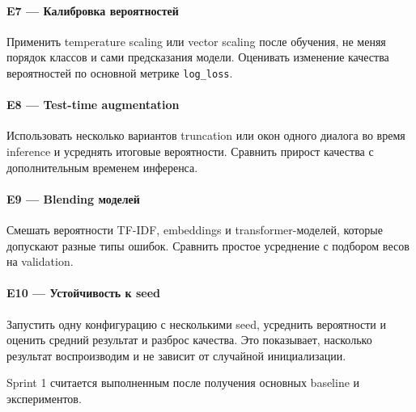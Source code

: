 \documentclass[a4paper,11pt]{article}
\newcommand{\code}[1]{\texttt{#1}}
\newcommand{\experiment}[2]{\paragraph{\textcolor{accent}{#1 --- #2}}}
\begin{document}
\experiment{E7}{Калибровка вероятностей}
Применить temperature scaling или vector scaling после обучения, не меняя
порядок классов и сами предсказания модели. Оценивать изменение качества
вероятностей по основной метрике \code{log\_loss}.

\experiment{E8}{Test-time augmentation}
Использовать несколько вариантов truncation или окон одного диалога во время
inference и усреднять итоговые вероятности. Сравнить прирост качества с
дополнительным временем инференса.

\experiment{E9}{Blending моделей}
Смешать вероятности TF-IDF, embeddings и transformer-моделей, которые допускают
разные типы ошибок. Сравнить простое усреднение с подбором весов на validation.

\experiment{E10}{Устойчивость к seed}
Запустить одну конфигурацию с несколькими seed, усреднить вероятности и оценить
средний результат и разброс качества. Это показывает, насколько результат
воспроизводим и не зависит от случайной инициализации.

\vfill
\begin{center}
  \small\color{darkgray}
  Sprint 1 считается выполненным после получения основных baseline и экспериментов.
\end{center}
\end{document}
